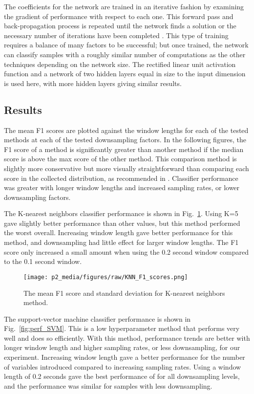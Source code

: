 The coefficients for the network are trained in an iterative fashion by examining 
the gradient of performance with respect to each one.
This forward pass and back-propagation process is repeated until the network finds 
a solution or the necessary number of iterations have been completed \cite{maxwell2017deep}.
This type of training requires a balance of many factors to be successful; but once trained,
the network can classify samples with a roughly similar number of computations as the other
techniques depending on the network size.
The rectified linear unit activation function and a network of two hidden layers 
equal in size to the input dimension is used here, with more hidden layers giving similar results.

\subsection{Results}

The mean F1 scores are plotted against the window lengths for each of the tested methods 
at each of the tested downsampling factors.
In the following figures, the F1 score of a method is significantly greater than another method
if the median score is above the max score of the other method.
This comparison method is slightly more conservative but more visually straightforward
than comparing each score in the collected distribution,
as recommended in \cite{Goutte2005}.
Classifier performance was greater with longer window lengths and 
increased sampling rates, or lower downsampling factors.

The K-nearest neighbors classifier performance is shown in Fig.~\ref{fig:perf_KNN}.
Using K=5 gave slightly better performance than other values, 
but this method performed the worst overall.
Increasing window length gave better performance for this method, and downsampling had little effect
for larger window lengths. 
The F1 score only increased a small amount when using the 0.2 second window compared to the 0.1 second window.

\begin{figure}[h]
\centering
\texttt{[image: p2\_media/figures/raw/KNN\_F1\_scores.png]}
\caption{The mean F1 score and standard deviation for K-nearest neighbors method. 
}
\label{fig:perf_KNN}
\end{figure}

The support-vector machine classifier performance is shown in Fig.~\ref{fig:perf_SVM}.
This is a low hyperparameter method that performs very well and does so efficiently. 
With this method, performance trends are better with longer window length and higher sampling rates, 
or less downsampling, for our experiment. Increasing window length gave a better performance for 
the number of variables introduced compared to increasing sampling rates. 
Using a window length of 0.2 seconds gave the best performance of for all downsampling levels, 
and the performance was similar for samples with less downsampling.

